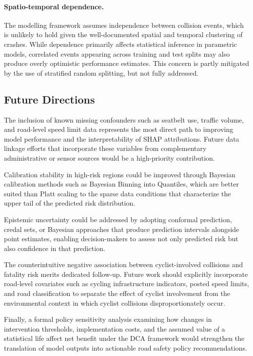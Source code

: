 \documentclass{article}
\begin{document}
\paragraph{Spatio-temporal dependence.} The modelling framework assumes independence between collision events, which is unlikely to hold given the well-documented spatial and temporal clustering of crashes.\cite{Spatio-temporal, Spatio-temporal-2} While dependence primarily affects statistical inference in parametric models, correlated events appearing across training and test splits may also produce overly optimistic performance estimates.\cite{dependence} This concern is partly mitigated by the use of stratified random splitting, but not fully addressed.

\subsection*{Future Directions}
The inclusion of known missing confounders such as seatbelt use, traffic volume, and road-level speed limit data represents the most direct path to improving model performance and the interpretability of SHAP attributions. Future data linkage efforts that incorporate these variables from complementary administrative or sensor sources would be a high-priority contribution.

Calibration stability in high-risk regions could be improved through Bayesian calibration methods such as Bayesian Binning into Quantiles,\cite{BBQ} which are better suited than Platt scaling to the sparse data conditions that characterize the upper tail of the predicted risk distribution.

Epistemic uncertainty could be addressed by adopting conformal prediction\cite{conformal}, credal sets, or Bayesian approaches that produce prediction intervals alongside point estimates, enabling decision-makers to assess not only predicted risk but also confidence in that prediction.

The counterintuitive negative association between cyclist-involved collisions and fatality risk merits dedicated follow-up. Future work should explicitly incorporate road-level covariates such as cycling infrastructure indicators, posted speed limits, and road classification to separate the effect of cyclist involvement from the environmental context in which cyclist collisions disproportionately occur.

Finally, a formal policy sensitivity analysis examining how changes in intervention thresholds, implementation costs, and the assumed value of a statistical life affect net benefit under the DCA framework would strengthen the translation of model outputs into actionable road safety policy recommendations.
\end{document}
